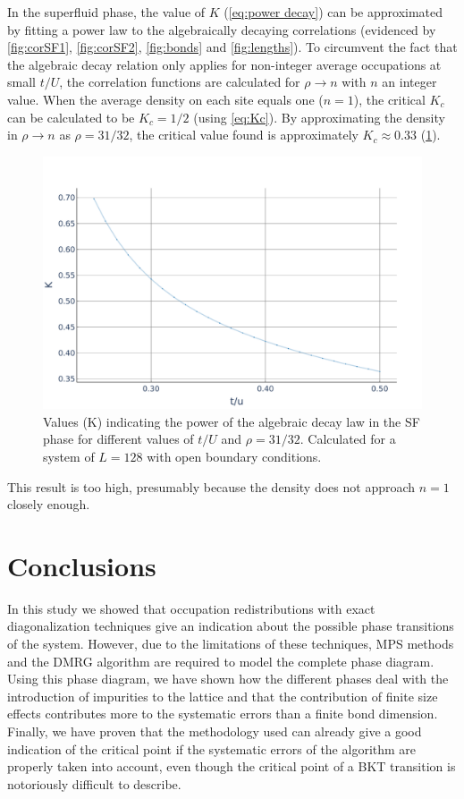 \documentclass[twoside,twocolumn,9pt]{article}
\begin{document}
In the superfluid phase, the value of $K$ (\cref{eq:power decay}) can be approximated by fitting a power law to the algebraically decaying correlations (evidenced by \cref{fig:corSF1}, \cref{fig:corSF2}, \cref{fig:bonds} and \cref{fig:lengths}). To circumvent the fact that the algebraic decay relation only applies for non-integer average occupations at small $t/U$, the correlation functions are calculated for $\rho\rightarrow n$ with $n$ an integer value. When the average density on each site equals one ($n=1$), the critical $K_c$ can be calculated to be $K_c=1/2$ (using \cref{eq:Kc}). By approximating the density in $\rho\rightarrow n$ as $\rho=31/32$, the critical value found is approximately $K_c\approx 0.33$ (\cref{fig:K values}).
\begin{center}
  \begin{figure}
      \includegraphics[width=\linewidth]{../code/figures/Correlations-K-values.pdf}
      \caption{Values (K) indicating the power of the algebraic decay law in the SF phase for different values of $t/U$ and $\rho=31/32$. Calculated for a system of $L=128$ with open boundary conditions.}
      \label{fig:K values}
  \end{figure}
\end{center}
This result is too high, presumably because the density does not approach $n=1$ closely enough.

\section{Conclusions}

In this study we showed that occupation redistributions with exact diagonalization techniques give an indication about the possible phase transitions of the system. However, due to the limitations of these techniques, MPS methods and the DMRG algorithm are required to model the complete phase diagram. Using this phase diagram, we have shown how the different phases deal with the introduction of impurities to the lattice and that the contribution of finite size effects contributes more to the systematic errors than a finite bond dimension. Finally, we have proven that the methodology used can already give a good indication of the critical point if the systematic errors of the algorithm are properly taken into account, even though the critical point of a BKT transition is notoriously difficult to describe.
\end{document}
